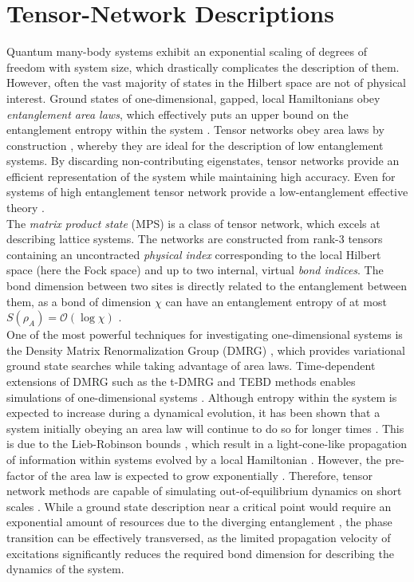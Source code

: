 \section{Tensor-Network Descriptions}
Quantum many-body systems exhibit an exponential scaling of degrees of freedom with system size, which drastically complicates the description of them. However, often the vast majority of states in the Hilbert space are not of physical interest. Ground states of one-dimensional, gapped, local Hamiltonians obey \textit{entanglement area laws}, which effectively puts an upper bound on the entanglement entropy within the system \cite{hastings2007area,eisert2010colloquium}. 
Tensor networks obey area laws by construction \cite{schollwock2011density}, whereby they are ideal for the description of low entanglement systems. By discarding non-contributing eigenstates, tensor networks provide an efficient representation of the system while maintaining high accuracy. Even for systems of high entanglement tensor network provide a low-entanglement effective theory \cite{gillman2018kibble}.\\ 
The \textit{matrix product state} (MPS) is a class of tensor network, which excels at describing lattice systems. The networks are constructed from rank-3 tensors containing an uncontracted \textit{physical index} corresponding to the local Hilbert space (here the Fock space) and up to two internal, virtual \textit{bond indices}. The bond dimension between two sites is directly related to the entanglement between them, as a bond of dimension $\chi$ can have an entanglement entropy of at most $S(\rho_A) = \mathcal{O}(\log \chi)$ \cite{schollwock2011density}.\\
One of the most powerful techniques for investigating one-dimensional systems is the Density Matrix Renormalization Group (DMRG) \cite{white1992density,white1993density}, which provides variational ground state searches while taking advantage of area laws. Time-dependent extensions of DMRG such as the t-DMRG and TEBD methods enables simulations of one-dimensional systems \cite{vidal2003efficient,vidal2004efficient,daley2004time}. Although entropy within the system is expected to increase during a dynamical evolution, it has been shown that a system initially obeying an area law will continue to do so for longer times \cite{bravyi2006lieb,eisert2006general}. This is due to the Lieb-Robinson bounds \cite{lieb1972finite}, which result in a light-cone-like propagation of information within systems evolved by a local Hamiltonian \cite{hastings2006spectral,cheneau2012light}. However, the pre-factor of the area law is expected to grow exponentially \cite{schuch2008entropy}. Therefore, tensor network methods are capable of simulating out-of-equilibrium dynamics on short scales \cite{eisert2015quantum}. 
While a ground state description near a critical point would require an exponential amount of resources due to the diverging entanglement \cite{vidal2003efficient}, the phase transition can be effectively transversed, as the limited propagation velocity of excitations significantly reduces the required bond dimension for describing the dynamics of the system. 


